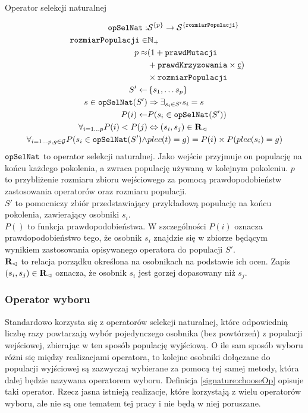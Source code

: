 \documentclass[./FM_mgr.tex]{subfiles}
\begin{document}
\begin{signature}
	\caption{Operator selekcji naturalnej \label{signature:natSel}}
	\begin{align}
	\mathtt{opSelNat}: &{\mathcal{S}}^{ \{ p \}} \rightarrow {\mathcal{S}}^{ \{ \mathtt{rozmiarPopulacji} \}} \\
	\mathtt{rozmiarPopulacji} \in &\mathbb{N}_{+} \\
	p \approx &(1 + \mathtt{prawdMutacji} \\
	&+ \mathtt{prawdKrzyzowania} \times \mathsf{\underline{c}}) \\
	&\times \mathtt{rozmiarPopulacji} \\
	S' \gets &\left\{ s_1, \ldots s_p \right\} \\
	s \in \mathtt{opSelNat}(S') &\Rightarrow \exists_{s_i \in S'}  s_i = s \\
	P(i) \gets &P(s_i \in \mathtt{opSelNat}(S')) \\
	\forall_{i = 1 \ldots p}P(i) < P(j) &\Leftrightarrow (s_i, s_j) \in {\mathbf{R}}_{\lhd} \\
	\label{line:gender_resistant}
	\forall_{i = 1 \ldots p, g \in \mathcal{G}} P(s_i \in \mathtt{opSelNat}(S') \wedge & plec(t) = g) = P(i) \times P(plec(s_i) = g)
	\end{align}
	$\mathtt{opSelNat}$ to operator selekcji naturalnej.
	Jako wejście przyjmuje on populację na końcu każdego pokolenia, a zwraca populację używaną w kolejnym pokoleniu.
	$p$ to przybliżenie rozmiaru zbioru wejściowego za pomocą prawdopodobieństw zastosowania operatorów oraz rozmiaru populacji.\\
	$S'$ to pomocniczy zbiór przedstawiający przykładową populację na końcu pokolenia, zawierający osobniki $s_i$. \\
	$P()$ to funkcja prawdopodobieństwa. 
	W szczególności $P(i)$ oznacza prawdopodobieństwo tego, że osobnik $s_i$ znajdzie się w zbiorze będącym wynikiem zastosowania opisywanego operatora do populacji $S'$.\\
	${\mathbf{R}}_{\lhd}$ to relacja porządku określona na osobnikach na podstawie ich ocen. Zapis $(s_i, s_j) \in {\mathbf{R}}_{\lhd}$ oznacza, że osobnik $s_i$ jest gorzej dopasowany niż $s_j$.
\end{signature}

\subsubsection{Operator wyboru}

Standardowo korzysta się z operatorów selekcji naturalnej, które odpowiednią liczbę razy powtarzają wybór pojedynczego osobnika (bez powtórzeń) z populacji wejściowej, zbierając w ten sposób populację wyjściową. 
O ile sam sposób wyboru różni się między realizacjami operatora, to kolejne osobniki dołączane do populacji wyjściowej są zazwyczaj wybierane za pomocą tej samej metody, która dalej będzie nazywana operatorem wyboru.
Definicja \ref{signature:chooseOp} opisuje taki operator.
Rzecz jasna istnieją realizacje, które korzystają z wielu operatorów wyboru, ale nie są one tematem tej pracy i nie będą w niej poruszane.
\end{document}
